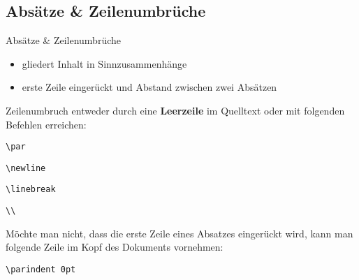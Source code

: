 \subsection{Absätze \& Zeilenumbrüche}
\begin{frame}[fragile]{Absätze \& Zeilenumbrüche}
\begin{itemize}
\item gliedert Inhalt in Sinnzusammenhänge
\item erste Zeile eingerückt und Abstand zwischen zwei Absätzen
\end{itemize}
\pause
Zeilenumbruch entweder durch eine \textbf{Leerzeile} im Quelltext oder mit folgenden Befehlen erreichen:
\begin{multicols}{2}
\begin{lstlisting}[style=tex]
\par\end{lstlisting}
\begin{lstlisting}[style=tex]
\newline\end{lstlisting}
\begin{lstlisting}[style=tex]
\linebreak\end{lstlisting}
\begin{lstlisting}[style=tex]
\\\end{lstlisting}
\end{multicols}\pause

Möchte man nicht, dass die erste Zeile eines Absatzes eingerückt wird, kann man folgende Zeile im Kopf des Dokuments vornehmen:
\begin{lstlisting}[style=tex]
\parindent 0pt\end{lstlisting}
\end{frame}

